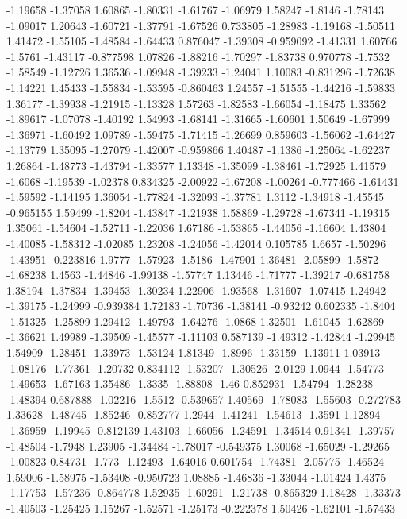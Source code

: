 \documentclass[9pt]{article}
\theoremstyle{plain}
\theoremstyle{definition}
\theoremstyle{remark}
\numberwithin{equation}{section}
\begin{document}
-1.19658
-1.37058
1.60865
-1.80331
-1.61767
-1.06979
1.58247
-1.8146
-1.78143
-1.09017
1.20643
-1.60721
-1.37791
-1.67526
0.733805
-1.28983
-1.19168
-1.50511
1.41472
-1.55105
-1.48584
-1.64433
0.876047
-1.39308
-0.959092
-1.41331
1.60766
-1.5761
-1.43117
-0.877598
1.07826
-1.88216
-1.70297
-1.83738
0.970778
-1.7532
-1.58549
-1.12726
1.36536
-1.09948
-1.39233
-1.24041
1.10083
-0.831296
-1.72638
-1.14221
1.45433
-1.55834
-1.53595
-0.860463
1.24557
-1.51555
-1.44216
-1.59833
1.36177
-1.39938
-1.21915
-1.13328
1.57263
-1.82583
-1.66054
-1.18475
1.33562
-1.89617
-1.07078
-1.40192
1.54993
-1.68141
-1.31665
-1.60601
1.50649
-1.67999
-1.36971
-1.60492
1.09789
-1.59475
-1.71415
-1.26699
0.859603
-1.56062
-1.64427
-1.13779
1.35095
-1.27079
-1.42007
-0.959866
1.40487
-1.1386
-1.25064
-1.62237
1.26864
-1.48773
-1.43794
-1.33577
1.13348
-1.35099
-1.38461
-1.72925
1.41579
-1.6068
-1.19539
-1.02378
0.834325
-2.00922
-1.67208
-1.00264
-0.777466
-1.61431
-1.59592
-1.14195
1.36054
-1.77824
-1.32093
-1.37781
1.3112
-1.34918
-1.45545
-0.965155
1.59499
-1.8204
-1.43847
-1.21938
1.58869
-1.29728
-1.67341
-1.19315
1.35061
-1.54604
-1.52711
-1.22036
1.67186
-1.53865
-1.44056
-1.16604
1.43804
-1.40085
-1.58312
-1.02085
1.23208
-1.24056
-1.42014
0.105785
1.6657
-1.50296
-1.43951
-0.223816
1.9777
-1.57923
-1.5186
-1.47901
1.36481
-2.05899
-1.5872
-1.68238
1.4563
-1.44846
-1.99138
-1.57747
1.13446
-1.71777
-1.39217
-0.681758
1.38194
-1.37834
-1.39453
-1.30234
1.22906
-1.93568
-1.31607
-1.07415
1.24942
-1.39175
-1.24999
-0.939384
1.72183
-1.70736
-1.38141
-0.93242
0.602335
-1.8404
-1.51325
-1.25899
1.29412
-1.49793
-1.64276
-1.0868
1.32501
-1.61045
-1.62869
-1.36621
1.49989
-1.39509
-1.45577
-1.11103
0.587139
-1.49312
-1.42844
-1.29945
1.54909
-1.28451
-1.33973
-1.53124
1.81349
-1.8996
-1.33159
-1.13911
1.03913
-1.08176
-1.77361
-1.20732
0.834112
-1.53207
-1.30526
-2.0129
1.0944
-1.54773
-1.49653
-1.67163
1.35486
-1.3335
-1.88808
-1.46
0.852931
-1.54794
-1.28238
-1.48394
0.687888
-1.02216
-1.5512
-0.539657
1.40569
-1.78083
-1.55603
-0.272783
1.33628
-1.48745
-1.85246
-0.852777
1.2944
-1.41241
-1.54613
-1.3591
1.12894
-1.36959
-1.19945
-0.812139
1.43103
-1.66056
-1.24591
-1.34514
0.91341
-1.39757
-1.48504
-1.7948
1.23905
-1.34484
-1.78017
-0.549375
1.30068
-1.65029
-1.29265
-1.00823
0.84731
-1.773
-1.12493
-1.64016
0.601754
-1.74381
-2.05775
-1.46524
1.59006
-1.58975
-1.53408
-0.950723
1.08885
-1.46836
-1.33044
-1.01424
1.4375
-1.17753
-1.57236
-0.864778
1.52935
-1.60291
-1.21738
-0.865329
1.18428
-1.33373
-1.40503
-1.25425
1.15267
-1.52571
-1.25173
-0.222378
1.50426
-1.62101
-1.57433
\end{document}
